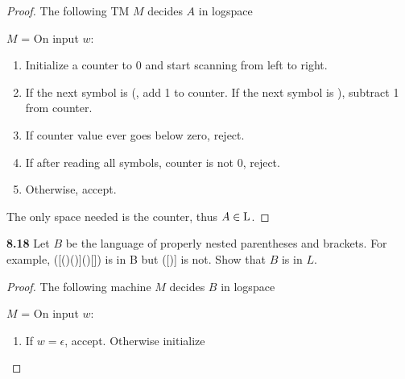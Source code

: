 \begin{mdframed}
\begin{proof}
The following TM $M$ decides $A$ in logspace

\medskip
$M$ = On input $w$:
\begin{enumerate}
\item Initialize a counter to 0 and start scanning from left to right.
\item If the next symbol is (, add 1 to counter. If the next symbol is ), subtract 1 from counter.
\item If counter value ever goes below zero, reject.
\item If after reading all symbols, counter is not 0, reject.
\item Otherwise, accept.
\end{enumerate}
The only space needed is the counter, thus $A \in \text{L}$.
\end{proof}
\end{mdframed}

\textbf{8.18} Let $B$ be the language of properly nested parentheses and brackets. For example, ([()()]()[]) is in B but ([)] is not. Show that $B$ is in $L$.
\begin{mdframed}
\begin{proof}
The following machine $M$ decides $B$ in logspace

\medskip
$M$ = On input $w$:
\begin{enumerate}
\item If $w = \epsilon$, accept. Otherwise initialize 
\end{enumerate}
\end{proof}
\end{mdframed}

